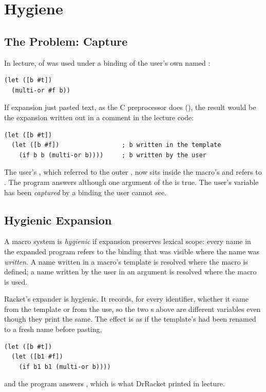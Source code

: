 \section{Hygiene}
\label{sec:hygiene}

\subsection{The Problem: Capture}

In lecture,  of  was used under a binding of the user's own named :
\begin{lstlisting}
(let ([b #t])
  (multi-or #f b))
\end{lstlisting}
If expansion just pasted text, as the C preprocessor does (), the result would be the expansion written out in a comment in the lecture code:
\begin{lstlisting}
(let ([b #t])
  (let ([b #f])                 ; b written in the template
    (if b b (multi-or b))))     ; b written by the user
\end{lstlisting}
The user's , which referred to the outer , now sits inside the macro's  and refers to . The program answers  although one argument of the  is true. The user's variable has been \emph{captured} by a binding the user cannot see.

\subsection{Hygienic Expansion}

\begin{definition}
A macro system is \emph{hygienic} if expansion preserves lexical scope: every name in the expanded program refers to the binding that was visible where the name was \emph{written}. A name written in a macro's template is resolved where the macro is defined; a name written by the user in an argument is resolved where the macro is used.
\end{definition}

Racket's expander is hygienic. It records, for every identifier, whether it came from the template or from the use, so the two s above are different variables even though they print the same. The effect is as if the template's  had been renamed to a fresh name before pasting,
\begin{lstlisting}
(let ([b #t])
  (let ([b1 #f])
    (if b1 b1 (multi-or b))))
\end{lstlisting}
and the program answers , which is what DrRacket printed in lecture.

